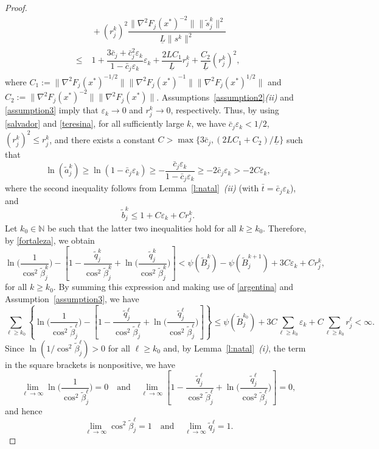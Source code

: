 \documentclass[11pt]{article}
\numberwithin{assumption}{section}
\newcommand{\N}{\mathbb{N}}
\newcommand{\ts}{\tilde{s}_j^k}
\newcommand{\tq}{\tilde{q}_j^k}
\newcommand{\ta}{\tilde{a}_j^k}
\newcommand{\tB}{\tilde{B}_j^k}
\newcommand{\tb}{\tilde{b}_j^k}
\begin{document}
\begin{proof}
\begin{align}
  & \; +  (r_j^k)^2\dfrac{\|\nabla^2F_j(x^{*})^{-2}\| \|\ts\|^2}{\underline{L}\|s^k\|^2}  \nonumber \\
    \leq & \; 1+ \dfrac{3\bar{c}_j+\bar{c}_j^2\varepsilon_k}{1-\bar{c}_j\varepsilon_k}\varepsilon_k
    + \dfrac{2LC_1}{\underline{L}}r_j^k +  \dfrac{C_2}{\underline{L}}(r_j^k)^2, \label{teresina}
 \end{align}
 where $C_1:=\|\nabla^2F_j(x^{*})^{-1/2}\| \|\nabla^2F_j(x^{*})^{-1}\| \|\nabla^2F_j(x^{*})^{1/2}\|$ and $C_2:=\|\nabla^2F_j(x^{*})^{-2}\| \|\nabla^2F_j(x^{*})\|$. Assumptions~\ref{assumption2}{\it (ii)} and \ref{assumption3} imply that $\varepsilon_k \to 0$ and $r_j^k\to 0$, respectively. Thus, by using \eqref{salvador} and \eqref{teresina}, for all sufficiently large $k$, we have $\bar{c}_j\varepsilon_k <1/2$, $(r_j^k)^2\leq r_j^k$, and there exists a constant $C>\max\{3\bar{c}_j,(2LC_1+C_2)/\underline{L}\}$ such that
\[\ln(\ta)\geq \ln(1-\bar{c}_j\varepsilon_k)\geq -\dfrac{\bar{c}_j\varepsilon_k}{1-\bar{c}_j\varepsilon_k}\geq -2\bar{c}_j\varepsilon_k>-2C\varepsilon_k,\]
where the second inequality follows from Lemma~\ref{l:natal}~{\it (ii)} (with $\bar{t}=\bar{c}_j\varepsilon_k$), and 
\[\tb\leq 1+ C\varepsilon_k + C r_j^k.\]
 Let $k_0\in\N$ be such that the latter two inequalities hold for all $k\geq k_0$.
 Therefore, by \eqref{fortaleza}, we obtain
 \[\ln\Big(\dfrac{1}{\cos^2\tilde{\beta}_j^k}\Big)- \left[1 - \dfrac{\tq}{\cos^2\tilde{\beta}_j^k} + \ln\bigg(\dfrac{\tq}{\cos^2\tilde{\beta}_j^k}\bigg)\right]<  \psi(\tB)-\psi(\tilde{B}_j^{k+1}) + 3C\varepsilon_k + C r_j^k,\]
  for all $k\geq k_0$. By summing this expression and making use of \eqref{argentina} and Assumption~\ref{assumption3}, we have   
 \[\sum_{\ell\geq k_0} \left\{\ln\Big(\dfrac{1}{\cos^2\tilde{\beta}_j^\ell}\Big)- \left[1 - \dfrac{\tilde{q}_j^\ell}{\cos^2\tilde{\beta}_j^\ell} + \ln\bigg(\dfrac{\tilde{q}_j^\ell}{\cos^2\tilde{\beta}_j^\ell}\bigg)\right]\right\}\leq  \psi(\tilde{B}_j^{k_0}) + 3C\sum_{\ell\geq k_0} \varepsilon_k + C \sum_{\ell\geq k_0} r_j^\ell<\infty.\]
Since $\ln(1/\cos^2\tilde{\beta}_j^\ell)>0$ for all $\ell\geq k_0$ and, by Lemma~\ref{l:natal}~{\it (i)}, the term in the square brackets is nonpositive, we have
\[\lim_{\ell\to\infty}\ln\Big(\dfrac{1}{\cos^2\tilde{\beta}_j^\ell}\Big)=0 \quad \mbox{and} \quad\lim_{\ell\to\infty} \left[1 - \dfrac{\tilde{q}_j^\ell}{\cos^2\tilde{\beta}_j^\ell} + \ln\bigg(\dfrac{\tilde{q}_j^\ell}{\cos^2\tilde{\beta}_j^\ell}\bigg)\right] = 0,\]
and hence
 \begin{equation}\label{palmas} 
 \lim_{\ell\to\infty} \cos^2\tilde{\beta}_j^\ell =1 \quad \mbox{and} \quad\lim_{\ell\to\infty} \tilde{q}_j^\ell = 1.

\end{equation}
\end{proof}
\end{document}

